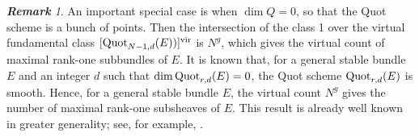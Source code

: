\documentclass[11pt]{amsart}
\theoremstyle{remark}
\newtheorem{remark}[theorem]{\bf Remark}
\newcommand{\quot}[0]{\textnormal{Quot}}
\newcommand{\vir}[0]{\textnormal{vir}}
\numberwithin{theorem}{section}
\begin{document}
\begin{remark}
An important special case is when $\dim Q =0$, 
so that the Quot scheme is a bunch of points.
Then the intersection of the class 1 over the virtual fundamental class $[\quot_{N-1,d}(E))]^\vir$ is $N^g$,
which gives the virtual count of maximal rank-one subbundles of $E$.
It is known that, for a general stable bundle $E$
and an integer $d$ such that $\dim \quot_{r,d}(E)=0$, 
the Quot scheme $\quot_{r,d}(E)$ is smooth.
Hence, for a general stable bundle $E$, the virtual count $N^g$ gives the number of maximal rank-one
subsheaves of $E$.
This result is already well known in greater generality; see, for example, \cite[Corollary 4.3]{Hol04}.
\end{remark}


    \vspace{1cm}
\end{document}
